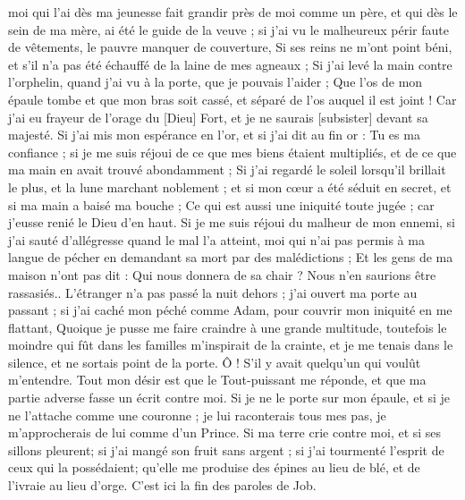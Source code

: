 \begin{multicols}{2}
moi qui l'ai dès ma jeunesse fait grandir près de moi comme un père, et qui dès le sein de ma mère, ai été le guide de la veuve ;
si j'ai vu le malheureux périr faute de vêtements, le pauvre manquer de couverture,
Si ses reins ne m'ont point béni, et s'il n'a pas été échauffé de la laine de mes agneaux ;
Si j'ai levé la main contre l'orphelin, quand j'ai vu à la porte, que je pouvais l'aider ;
Que l'os de mon épaule tombe et que mon bras soit cassé, et séparé de l'os auquel il est joint !
Car j'ai eu frayeur de l'orage du [Dieu] Fort, et je ne saurais [subsister] devant sa majesté. 
Si j'ai mis mon espérance en l'or, et si j'ai dit au fin or : Tu es ma confiance ;
si je me suis réjoui de ce que mes biens étaient multipliés, et de ce que ma main en avait trouvé abondamment ;
Si j'ai regardé le soleil lorsqu'il brillait le plus, et la lune marchant noblement ;
et si mon cœur a été séduit en secret, et si ma main a baisé ma bouche ; 
Ce qui est aussi une iniquité toute jugée ; car j'eusse renié le Dieu d'en haut.
Si je me suis réjoui du malheur de mon ennemi, si j'ai sauté d'allégresse quand le mal l'a atteint,
moi qui n'ai pas permis à ma langue de pécher en demandant sa mort par des malédictions ;
Et les gens de ma maison n'ont pas dit : Qui nous donnera de sa chair ? Nous n'en saurions être rassasiés..
L'étranger n'a pas passé la nuit dehors ; j'ai ouvert ma porte au passant ;
si j'ai caché mon péché comme Adam, pour couvrir mon iniquité en me flattant,
Quoique je pusse me faire craindre à une grande multitude, toutefois le moindre qui fût dans les familles m'inspirait de la crainte, et je me tenais dans le silence, et ne sortais point de la porte.
Ô ! S'il y avait quelqu'un qui voulût m'entendre. Tout mon désir est que le Tout-puissant me réponde, et que ma partie adverse fasse un écrit contre moi.
Si je ne le porte sur mon épaule, et si je ne l'attache comme une couronne ;
je lui raconterais tous mes pas, je m'approcherais de lui comme d'un Prince.
Si ma terre crie contre moi, et si ses sillons pleurent;
si j'ai mangé son fruit sans argent ; si j'ai tourmenté l'esprit de ceux qui la possédaient;
qu'elle me produise des épines au lieu de blé, et de l'ivraie au lieu d'orge. C'est ici la fin des paroles de Job.

\end{multicols}

